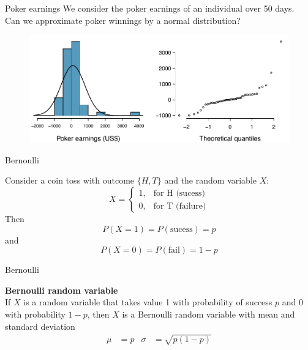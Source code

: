 \documentclass[12pt,a4paper]{beamer}
\begin{document}
\begin{frame}{Poker earnings}
	We consider the poker earnings of an individual over 50 days.\\
	Can we approximate poker winnings by a normal distribution?
	\begin{figure}
	\centering
	\includegraphics[width=\textwidth]{figures/pokerNormal/pokerNormal}
	\end{figure}
\end{frame}
\begin{frame}{Bernoulli}
	
Consider a coin toss with outcome $\{H,T\}$ and the random variable $X:$
\[
X=\left\lbrace\begin{array}{lr}
1,&\text{for H (sucess)}\\
0,&\text{for T (failure)}
\end{array}\right.\]
	Then
	\[P(X=1)=P(\text{sucess})=p\] 
	 and 
	 \[P(X=0)=P(\text{fail})=1-p\]
	\end{frame}
	\begin{frame}{Bernoulli}
		\begin{framed}

		\textbf{Bernoulli random variable }\\
		If $X$ is a random variable that takes value 1 with probability of success $p$ and 0 with probability $1-p$, then $X$ is a Bernoulli random variable with mean and standard deviation
		\begin{align*}
		\mu &= p
			&\sigma&= \sqrt{p(1-p)}
		\end{align*}
	\end{framed}
\end{frame}
\end{document}
